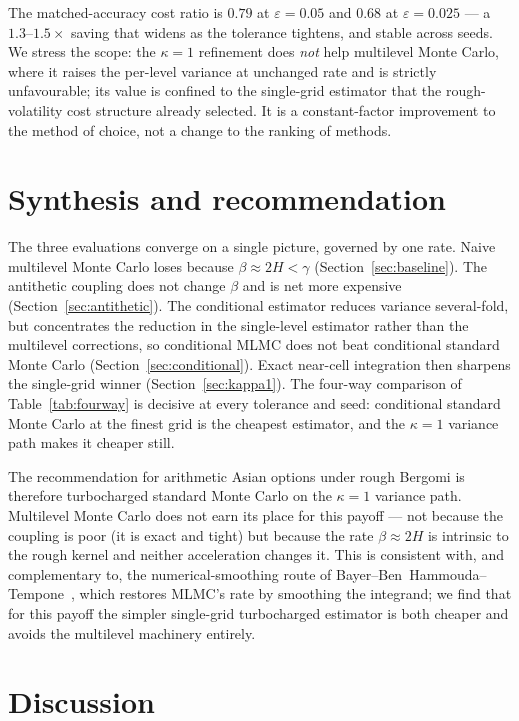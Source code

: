 \documentclass[11pt]{article}
\begin{document}
The matched-accuracy cost ratio is $0.79$ at $\varepsilon=0.05$ and $0.68$ at
$\varepsilon=0.025$ --- a $1.3$--$1.5\times$ saving that widens as the tolerance tightens,
and stable across seeds. We stress the scope: the $\kappa=1$ refinement does \emph{not} help
multilevel Monte Carlo, where it raises the per-level variance at unchanged rate and is
strictly unfavourable; its value is confined to the single-grid estimator that the
rough-volatility cost structure already selected. It is a constant-factor improvement to the
method of choice, not a change to the ranking of methods.

\section{Synthesis and recommendation}
\label{sec:results}

The three evaluations converge on a single picture, governed by one rate. Naive multilevel
Monte Carlo loses because $\beta\approx2H<\gamma$ (Section~\ref{sec:baseline}). The antithetic
coupling does not change $\beta$ and is net more expensive (Section~\ref{sec:antithetic}). The
conditional estimator reduces variance several-fold, but concentrates the reduction in the
single-level estimator rather than the multilevel corrections, so conditional MLMC does not
beat conditional standard Monte Carlo (Section~\ref{sec:conditional}). Exact near-cell
integration then sharpens the single-grid winner (Section~\ref{sec:kappa1}). The four-way
comparison of Table~\ref{tab:fourway} is decisive at every tolerance and seed: conditional
standard Monte Carlo at the finest grid is the cheapest estimator, and the $\kappa=1$ variance
path makes it cheaper still.

The recommendation for arithmetic Asian options under rough Bergomi is therefore turbocharged
standard Monte Carlo on the $\kappa=1$ variance path. Multilevel Monte Carlo does not earn its
place for this payoff --- not because the coupling is poor (it is exact and tight) but because
the rate $\beta\approx2H$ is intrinsic to the rough kernel and neither acceleration changes it.
This is consistent with, and complementary to, the numerical-smoothing route of
Bayer--Ben~Hammouda--Tempone~\cite{bht2020}, which restores MLMC's rate by smoothing the
integrand; we find that for this payoff the simpler single-grid turbocharged estimator is both
cheaper and avoids the multilevel machinery entirely.

\section{Discussion}
\label{sec:discussion}
\end{document}
